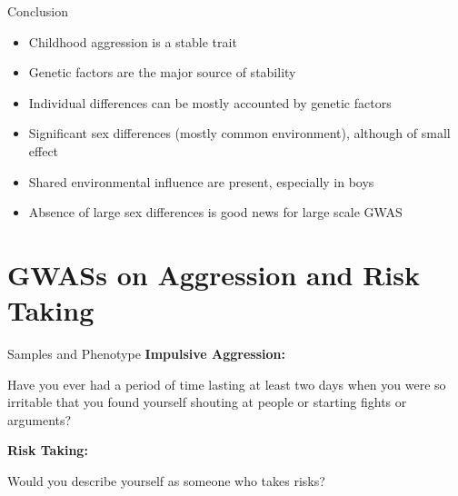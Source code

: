 \documentclass{beamer}
\begin{document}
\begin{frame}[t]{Conclusion}
  \begin{itemize}
    \item Childhood aggression is a stable trait
    \item Genetic factors are the major source of stability
    \item Individual differences can be mostly accounted by genetic factors
    \item Significant sex differences (mostly common environment), although of small effect
    \item Shared environmental influence are present, especially in boys
    \item Absence of large sex differences is good news for large scale GWAS
  \end{itemize}	
\end{frame}

\section{GWASs on Aggression and Risk Taking}

\begin{frame}[t]{Samples and Phenotype}
  \small
  \textbf{Impulsive Aggression:}
  \begin{displayquote}
    Have you ever had a period of time lasting at least two days when you were so irritable that you found yourself shouting at people or starting fights or arguments?
  \end{displayquote}
  \textbf{Risk Taking:}
  \begin{displayquote}
    Would you describe yourself as someone who takes risks?
  \end{displayquote}
  \resizebox{\textwidth}{!}{}
\end{frame}
\end{document}

